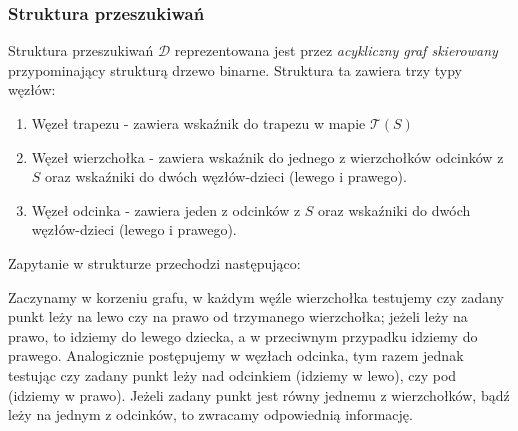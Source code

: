 \documentclass[11pt,a4paper]{article}
\begin{document}
\subsubsection{Struktura przeszukiwań}
Struktura przeszukiwań $\mathscr{D}$ reprezentowana
jest przez \textit{acykliczny graf skierowany} 
przypominający strukturą drzewo binarne. Struktura
ta zawiera trzy typy węzłów:
\begin{enumerate}
    \item Węzeł trapezu
    - zawiera wskaźnik do trapezu w mapie $\mathscr{T}(S)$
    \item Węzeł wierzchołka
    - zawiera wskaźnik do jednego z wierzchołków odcinków z $S$
    oraz wskaźniki do dwóch węzłów-dzieci (lewego i prawego).
    \item Węzeł odcinka
    - zawiera jeden z odcinków z $S$
    oraz wskaźniki do dwóch węzłów-dzieci (lewego i prawego).
\end{enumerate}
Zapytanie w strukturze przechodzi następująco:

Zaczynamy w korzeniu grafu, w każdym węźle wierzchołka 
testujemy czy zadany punkt leży na lewo czy na prawo od 
trzymanego wierzchołka; jeżeli leży na prawo, to idziemy
do lewego dziecka, a w przeciwnym przypadku idziemy do prawego.
Analogicznie postępujemy w węzłach odcinka, tym razem jednak
testując czy zadany punkt leży nad odcinkiem (idziemy w lewo),
czy pod (idziemy w prawo). Jeżeli zadany punkt jest równy
jednemu z wierzchołków, bądź leży na jednym z odcinków, to
zwracamy odpowiednią informację.
\end{document}
